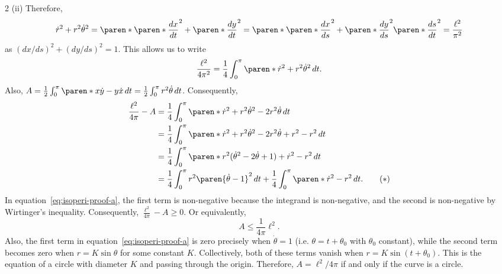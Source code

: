 \documentclass[11pt]{penrose}
\begin{document}
\begin{problem}{2 (ii)}
    Therefore,
    \begin{equation*}
        \dot{r}^2 + r^2 \dot{\theta}^2
        = \paren*{ \paren*{\frac{dx}{dt}}^2 + \paren*{\frac{dy}{dt}}^2 }
        = \paren*{ \paren*{\frac{dx}{ds}}^2 + \paren*{\frac{dy}{ds}}^2 } \paren*{\frac{ds}{dt}}^2
        = \frac{\ell^2}{\pi^2}
    \end{equation*}
    as $(dx/ds)^2 + (dy/ds)^2 = 1$. This allows us to write
    \begin{equation*}
        \frac{\ell^2}{4\pi^2} = \frac{1}{4} \int_0^\pi \paren*{\dot{r}^2 + r^2 \dot{\theta}^2} \,dt.
    \end{equation*}
    Also, $A = \frac{1}{2} \int_0^\pi \paren*{x\dot{y} - y\dot{x}} \,dt = \frac{1}{2} \int_0^\pi r^2 \dot{\theta} \,dt$. Consequently,
    \begin{align*}
        \frac{\ell^2}{4\pi} - A
        &= \frac{1}{4} \int_0^\pi \paren*{\dot{r}^2 + r^2 \dot{\theta}^2 - 2r^2\dot{\theta}} \,dt\\
        &= \frac{1}{4} \int_0^\pi \paren*{\dot{r}^2 + r^2 \dot{\theta}^2 - 2r^2\dot{\theta} + r^2 - r^2} \,dt\\
        &= \frac{1}{4} \int_0^\pi \paren*{r^2 (\dot{\theta}^2 - 2\dot{\theta} + 1) + \dot{r}^2 - r^2} \,dt\\
        &= \frac{1}{4} \int_0^\pi r^2 \paren{\dot{\theta}-1}^2 \,dt + \frac{1}{4}\int_0^\pi \paren*{\dot{r}^2 - r^2} \,dt. \tag{\textasteriskcentered}
        \label{eq:isoperi-proof-a}
    \end{align*}
    In equation~\eqref{eq:isoperi-proof-a}, the first term is non-negative because the integrand is non-negative, and the second is non-negative by Wirtinger's inequality. Consequently, $\frac{\ell^2}{4\pi} - A \geq 0$. Or equivalently,
    \begin{equation*}
        A \leq \frac{1}{4\pi} \ell^2.
    \end{equation*}
    Also, the first term in equation~\eqref{eq:isoperi-proof-a} is zero precisely when $\dot{\theta} = 1$ (i.e. $\theta = t + \theta_0$ with $\theta_0$ constant), while the second term becomes zero when $r = K \sin\theta$ for some constant $K$. Collectively, both of these terms vanish when $r = K \sin(t + \theta_0)$. This is the equation of a circle with diameter $K$ and passing through the origin. Therefore, $A = \ell^2 / 4\pi$ if and only if the curve is a circle.
\end{problem}
\end{document}
